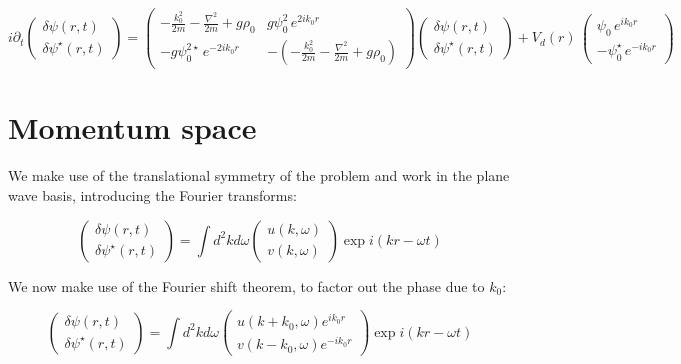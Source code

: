 \documentclass[a4paper,prb,10pt,aps]{revtex4-1}
\begin{document}
\begin{equation}
  \label{eq:14}
i\partial_{t}\left(\begin{array}{c}
\delta\psi(r,t)\\
\delta\psi^{\star}(r,t)
\end{array}\right)=\left(\begin{array}{cc}
-\frac{k_{0}^{2}}{2m}-\frac{\nabla^{2}}{2m}+g\rho_{0} & g\psi_{0}^{2}\, e^{2ik_{0}r}\\
-g\psi_{0}^{2\star}\, e^{-2ik_{0}r} & -\left(-\frac{k_{0}^{2}}{2m}-\frac{\nabla^{2}}{2m}+g\rho_{0}\right)
\end{array}\right)\left(\begin{array}{c}
\delta\psi(r,t)\\
\delta\psi^{\star}(r,t)
\end{array}\right)+V_{d}(r)\,\left(\begin{array}{c}
\psi_{0}\, e^{ik_{0}r}\\
-\psi_{0}^{\star}\, e^{-ik_{0}r}
\end{array}\right)
\end{equation}






\section{Momentum space}
We make use of the translational symmetry of the problem and work in the plane wave basis, introducing the Fourier transforms:

\begin{equation}
\left(\begin{array}{c}
\delta\psi(r,t)\\
\delta\psi^{\star}(r,t)
\end{array}\right) = \int d^2kd\omega \left(\begin{array}{c}
u(k,\omega)\\
v(k,\omega)
\end{array}\right)\exp{i(kr-\omega t)}
\end{equation}

We now make use of the Fourier shift theorem, to factor out the phase due to $k_0$:

\begin{equation}
\left(\begin{array}{c}
\delta\psi(r,t)\\
\delta\psi^{\star}(r,t)
\end{array}\right) = \int d^2kd\omega \left(\begin{array}{c}
u(k+k_0,\omega)e^{ik_0r}\\
v(k-k_0,\omega)e^{-ik_0r}
\end{array}\right)\exp{i(kr-\omega t)}
\end{equation}
\end{document}
